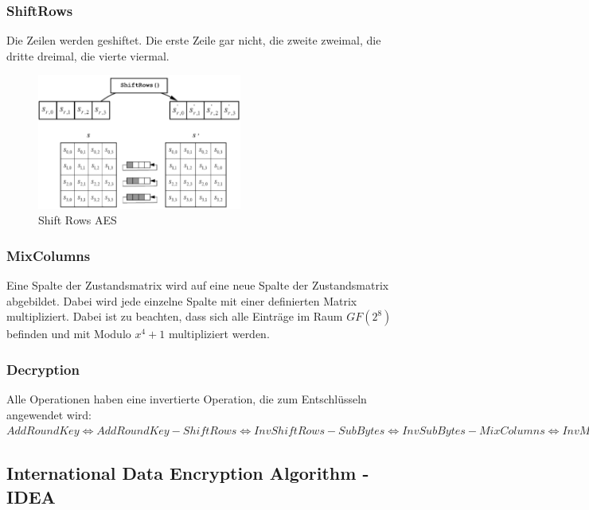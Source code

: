 \hypertarget{shiftrows}{%
\subsubsection{ShiftRows}\label{shiftrows}}

Die Zeilen werden geshiftet. Die erste Zeile gar nicht, die zweite
zweimal, die dritte dreimal, die vierte viermal.

\begin{figure}[H]
\centering
\includegraphics[width=0.6\textwidth]{figures/aesShiftRows.png}
\caption{Shift Rows AES}
\end{figure}

\hypertarget{mixcolumns}{%
\subsubsection{MixColumns}\label{mixcolumns}}

Eine Spalte der Zustandsmatrix wird auf eine neue Spalte der
Zustandsmatrix abgebildet. Dabei wird jede einzelne Spalte mit einer
definierten Matrix multipliziert. Dabei ist zu beachten, dass sich alle
Einträge im Raum $GF(2^8)$ befinden und mit Modulo $x^4+1$ multipliziert
werden.

\hypertarget{decryption}{%
\subsubsection{Decryption}\label{decryption}}

Alle Operationen haben eine invertierte Operation, die zum Entschlüsseln angewendet wird: $AddRoundKey \Leftrightarrow AddRoundKey - ShiftRows  \Leftrightarrow  InvShiftRows - SubBytes  \Leftrightarrow  InvSubBytes - MixColumns  \Leftrightarrow  InvMixColumns$

\hypertarget{international-data-encryption-algorithm---idea}{%
\subsection{International Data Encryption Algorithm -
IDEA}\label{international-data-encryption-algorithm---idea}}

